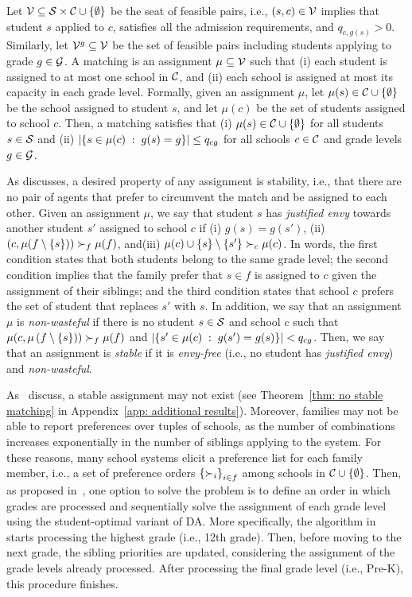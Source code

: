     Let \(\mathcal{V} \subseteq \mathcal{S} \times \mathcal{C}\cup \left\{\emptyset\right\}\) be the seat of feasible pairs, i.e., \((s,c) \in \mathcal{V}\) implies that student \(s\) applied to \(c\), satisfies all the admission requirements, and \(q_{c,g(s)} > 0\). Similarly, let \(\mathcal{V}^{g} \subseteq \mathcal{V}\) be the set of feasible pairs including students applying to grade \(g\in \mathcal{G}\). A matching is an assignment \(\mu\subseteq \mathcal{V}\) such that (i) each student is assigned to at most one school in \(\mathcal{C}\), and (ii) each school is assigned at most its capacity in each grade level. Formally, given an assignment \(\mu\), let \(\mu(s) \in \mathcal{C}\cup \left\{\emptyset\right\}\) be the school assigned to student \(s\), and let \(\mu(c)\) be the set of students assigned to school \(c\). Then, a matching satisfies that (i) \(\mu(s) \in \mathcal{C}\cup \left\{\emptyset\right\}\) for all students \(s\in \mathcal{S}\) and (ii) \(\left|\left\{s \in \mu(c)\;:\; g(s) = g\right\}\right| \leq q_{cg}\) for all schools \(c\in \mathcal{C}\) and grade levels \(g\in \mathcal{G}\).

    As \cite{roth02} discusses, a desired property of any assignment is stability, i.e., that there are no pair of agents that prefer to circumvent the match and be assigned to each other. Given an assignment \(\mu\), we say that student \(s\) has \emph{justified envy} towards another student \(s'\) assigned to school \(c\) if (i) \(g(s)=g(s')\), (ii) \(\left(c, \mu(f\setminus \left\{s\right\})\right) \succ_f \mu(f)\), and(iii) \(\mu(c) \cup \left\{s\right\} \setminus \left\{s'\right\} \succ_c \mu(c)\). In words, the first condition states that both students belong to the same grade level; the second condition implies that the family prefer that \(s\in f\) is assigned to \(c\) given the assignment of their siblings; and the third condition states that school \(c\) prefers the set of student that replaces \(s'\) with \(s\). In addition, we say that an assignment \(\mu\) is \emph{non-wasteful} if there is no student \(s\in \mathcal{S}\) and school \(c\) such that \(\mu(c, \mu\left(f\setminus\left\{s\right\}\right)) \succ_f \mu(f)\) and \(\left| \left\{ s'\in \mu(c)\;:\; g(s') = g(s)\right\} \right| < q_{cg}\). Then, we say that an assignment is \emph{stable} if it is \emph{envy-free} (i.e., no student has \emph{justified envy}) and \emph{non-wasteful}.

    As~\cite{Correa_2022} discuss, a stable assignment may not exist (see Theorem~\ref{thm: no stable matching} in Appendix~\ref{app: additional results}). Moreover, families may not be able to report preferences over tuples of schools, as the number of combinations increases exponentially in the number of siblings applying to the system. For these reasons, many school systems elicit a preference list for each family member, i.e., a set of preference orders \(\left\{\succ_i\right\}_{i\in f}\) among schools in \(\mathcal{C}\cup \left\{\emptyset\right\}\). Then, as proposed in~\cite{Correa_2022}, one option to solve the problem is to define an order in which grades are processed and sequentially solve the assignment of each grade level using the student-optimal variant of DA. More specifically, the algorithm in~\cite{Correa_2022} starts processing the highest grade (i.e., 12th grade). Then, before moving to the next grade, the sibling priorities are updated, considering the assignment of the grade levels already processed. After processing the final grade level (i.e., Pre-K), this procedure finishes.

